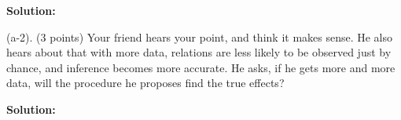 \documentclass[11pt]{article}
\newenvironment{question}
  {\itshape\list{}{\leftmargin=0em\rightmargin=0em}%
   \item\relax}
  {\endlist\ignorespacesafterend}
\newenvironment{solution}
  {\textbf{Solution: }\list{}{\leftmargin=1em\rightmargin=0em}%
   \item\relax}
  {\endlist\ignorespacesafterend}
\begin{document}
\begin{solution}
\end{solution}

\begin{question}
(a-2). (3 points) 
Your friend hears your point, and think it makes sense. He also hears about that with more data, relations are less likely to be observed just by chance, and inference becomes more accurate. He asks, if he gets more and more data, will the procedure he proposes find the true effects?
\end{question}

\begin{solution}
\end{solution}


\printbibliography%
\end{document}
